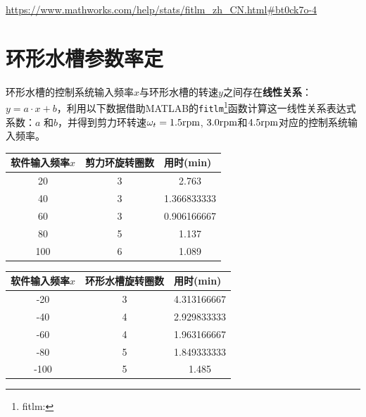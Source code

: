 \documentclass[a4paper]{article}
\begin{document}
\urldef\fitlmurl\url{https://www.mathworks.com/help/stats/fitlm_zh_CN.html#bt0ck7o-4}
\section{环形水槽参数率定}
环形水槽的控制系统输入频率$x$与环形水槽的转速$y$之间存在\textbf{线性关系}：$y=a \cdot x+b$，利用以下数据借助MATLAB的\texttt{fitlm}\footnote{fitlm: \fitlmurl}函数计算这一线性关系表达式系数：$a$ 和$b$，并得到剪力环转速$\omega_t = 1.5 \rm rpm $, $3.0\rm  rpm $和$4.5\rm rpm $对应的控制系统输入频率。

\begin{table}[htbp]
	\centering
\begin{tabular}{ccc}
\hline
\multicolumn{1}{l}{软件输入频率$x$} & \multicolumn{1}{l}{剪力环旋转圈数} & \multicolumn{1}{l}{用时(min)} \\ \hline
20                         & 3                           & 2.763                       \\
40                         & 3                           & 1.366833333                 \\
60                         & 3                           & 0.906166667                 \\
80                         & 5                           & 1.137                       \\
100                        & 6                           & 1.089                       \\ \hline
\end{tabular}
\end{table}

\begin{table}[htbp]
	\centering
\begin{tabular}{ccc}
\hline
\multicolumn{1}{l}{软件输入频率$x$} & \multicolumn{1}{l}{环形水槽旋转圈数} & \multicolumn{1}{l}{用时(min)} \\ \hline
-20                        & 3                           & 4.313166667                 \\
-40                        & 4                           & 2.929833333                 \\
-60                        & 4                           & 1.963166667                 \\
-80                        & 5                           & 1.849333333                 \\
-100                       & 5                           & 1.485                       \\ \hline
\end{tabular}
\end{table}
\end{document}
